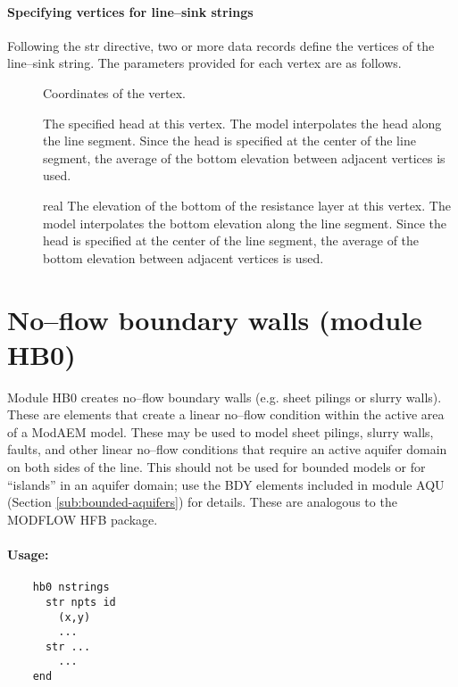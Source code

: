 \paragraph{Specifying vertices for line--sink strings}
Following the \textsf{str} directive, two or more data records define
the vertices of the line--sink string. The parameters provided for
each vertex are as follows.
\begin{description}
  \item [] Coordinates of the vertex. 
  \item [] The specified head at this vertex. The model 
    interpolates the head along the line segment. Since the head is specified at the
    center of the line segment, the average of the bottom elevation between
    adjacent vertices is used. 
  \item []{real} The elevation of the bottom of the resistance layer at
    this vertex. The model interpolates the bottom elevation along the
    line segment. Since the head is specified at the center of the line
    segment, the average of the bottom elevation between adjacent vertices
    is used. 
\end{description}
\newpage

\section{No--flow boundary walls (module HB0)\label{sec:hb0-module}}
Module HB0 creates no--flow boundary walls (e.g. sheet pilings or
slurry walls). These are elements that create a linear no--flow condition
within the active area of a ModAEM model. These may be used to model
sheet pilings, slurry walls, faults, and other linear no--flow conditions
that require an active aquifer domain on both sides of the line. This
should not be used for bounded models or for ``islands'' in an aquifer
domain; use the BDY elements included in module AQU (Section \ref{sub:bounded-aquifers})
for details. These are analogous to the MODFLOW HFB package.

\paragraph{Usage:}
\begin{verbatim}
    hb0 nstrings
      str npts id
        (x,y)
        ...
      str ...
        ...
    end
\end{verbatim}

